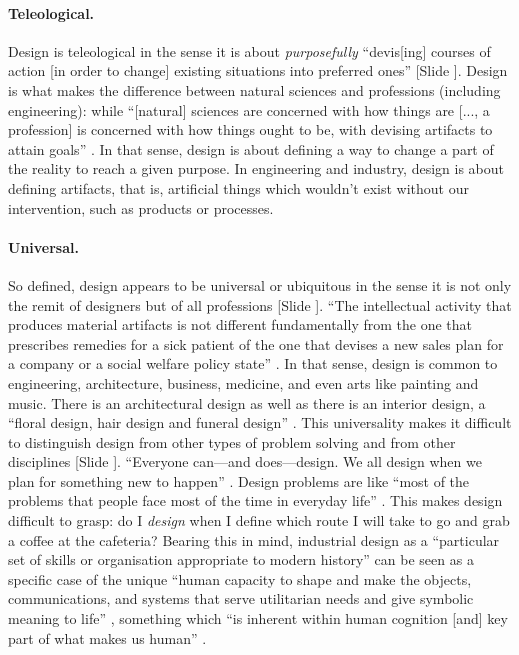 \documentclass{article}
\newcounter{slide}
\begin{document}
\paragraph{Teleological.} Design is teleological in the sense it is about \emph{purposefully} ``devis[ing] courses of action [in order to change] existing situations into preferred ones'' \cite[p. 111]{simon1996sciences} {\color{blue}[Slide ]}. Design is what makes the difference between natural sciences and professions (including engineering): while ``[natural] sciences are concerned with how things are [..., a profession] is concerned with how things ought to be, with devising artifacts to attain goals'' \cite[p. 114]{simon1996sciences}. In that sense, design is about defining a way to change a part of the reality to reach a given purpose. In engineering and industry, design is about defining artifacts, that is, artificial things which wouldn't exist without our intervention, such as products or processes. 

\paragraph{Universal.} So defined, design appears to be universal or ubiquitous in the sense it is not only the remit of designers but of all professions {\color{blue}[Slide ]}. ``The intellectual activity that produces material artifacts is not different fundamentally from the one that prescribes remedies for a sick patient of the one that devises a new sales plan for a company or a social welfare policy state'' \cite[p. 111]{simon1996sciences}. In that sense, design is common to engineering, architecture, business, medicine, and even arts like painting and music. There is an architectural design as well as there is an interior design, a ``floral design, hair design and funeral design'' \cite{heskett2001past}. This universality makes it difficult to distinguish design from other types of problem solving \cite{hatchuel2003new} and from other disciplines {\color{blue}[Slide ]}. ``Everyone can---and does---design. We all design when we plan for something new to happen'' \cite{cross2011design}. Design problems are like ``most of the problems that people face most of the time in everyday life'' \cite{archerDesignDiscipline1979}. This makes design difficult to grasp: do I \emph{design} when I define which route I will take to go and grab a coffee at the cafeteria? Bearing this in mind, industrial design as a ``particular set of skills or organisation appropriate to modern history'' can be seen as a specific case of the unique ``human capacity to shape and make the objects, communications, and systems that serve utilitarian needs and give symbolic meaning to life'' \cite{heskett2001past}, something which ``is inherent within human cognition [and] key part of what makes us human'' \cite{cross2011design}.
\end{document}
